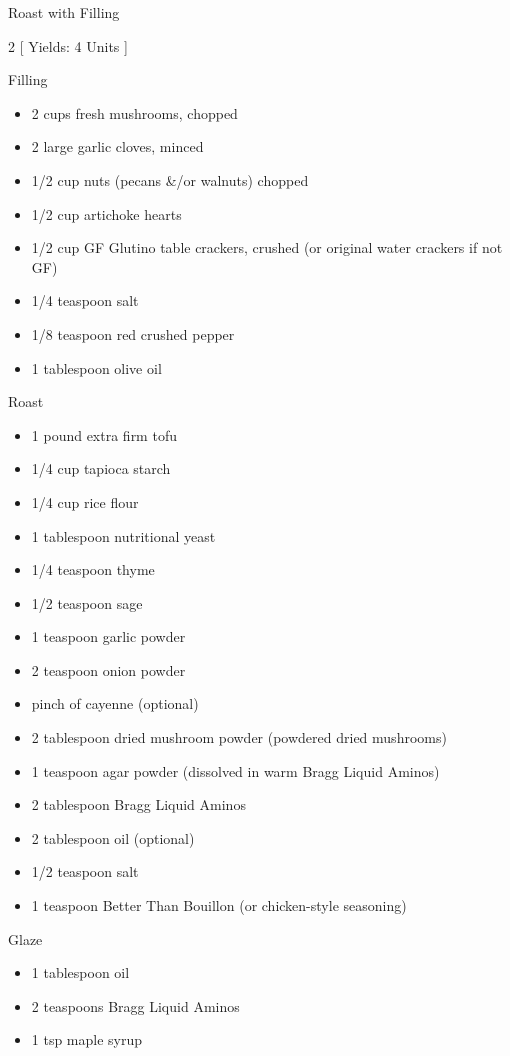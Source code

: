 \begin{Large}
    Roast with Filling
\end{Large}

\begin{scriptsize}
\begin{multicols}{2}
[
\vspace{1em}
Yields: 4 Units
\vspace{-1.5em}
]

Filling
\begin{itemize}
    \item 2 cups fresh mushrooms, chopped
    \item 2 large garlic cloves, minced
    \item 1/2 cup nuts (pecans \&/or walnuts) chopped
    \item 1/2 cup artichoke hearts
    \item 1/2 cup GF Glutino table crackers, crushed (or original water crackers if not GF)
    \item 1/4 teaspoon salt
    \item 1/8 teaspoon red crushed pepper
    \item 1 tablespoon olive oil
\end{itemize}

Roast
\begin{itemize}
    \item 1 pound extra firm tofu
    \item 1/4 cup tapioca starch
    \item 1/4 cup rice flour
    \item 1 tablespoon nutritional yeast
    \item 1/4 teaspoon thyme
    \item 1/2 teaspoon sage
    \item 1 teaspoon garlic powder
    \item 2 teaspoon onion powder
    \item pinch of cayenne (optional)
    \item 2 tablespoon dried mushroom powder (powdered dried mushrooms)
    \item 1 teaspoon agar powder (dissolved in warm Bragg Liquid Aminos)
    \item 2 tablespoon Bragg Liquid Aminos
    \item 2 tablespoon oil (optional)
    \item 1/2 teaspoon salt
    \item 1 teaspoon Better Than Bouillon (or chicken-style seasoning)
\end{itemize}

Glaze
\begin{itemize}
    \item 1 tablespoon oil
    \item 2 teaspoons Bragg Liquid Aminos
    \item 1 tsp maple syrup
\end{itemize}
\end{multicols}
\end{scriptsize}

